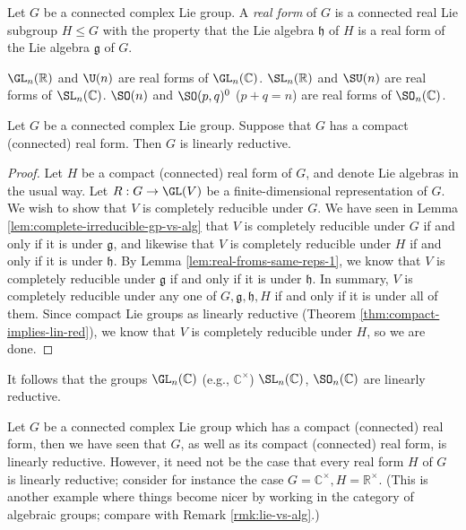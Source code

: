 \documentclass[reqno]{amsart} 
\begin{document}
\begin{definition}
  Let $G$ be a connected complex Lie group.
  A \emph{real form} of $G$ is a connected
  real Lie subgroup $H \leq G$
  with the property that
  the Lie algebra $\mathfrak{h}$ of $H$ is a real form
  of the Lie algebra $\mathfrak{g}$ of $G$.
\end{definition}


\begin{example}
  $\GL_n(\mathbb{R})$ and $\U(n)$
  are real forms of
  $\GL_n(\mathbb{C})$.
  $\SL_n(\mathbb{R})$ and $\SU(n)$
  are real forms of
  $\SL_n(\mathbb{C})$.
  $\SO(n)$ and $\SO(p,q)^0$ ($p + q = n$)
  are real forms of
  $\SO_n(\mathbb{C})$.
\end{example}
\begin{theorem}\label{thm:real-form-implies-linearly-reductive}
  Let $G$ be a connected complex Lie group.
  Suppose that $G$ has a compact (connected) real form.
  Then $G$ is linearly reductive.
\end{theorem}
\begin{proof}
  Let $H$ be a compact (connected) real form of $G$, and denote Lie algebras
  in the usual way.  Let $R : G \rightarrow \GL(V)$ be a
  finite-dimensional representation of $G$.
  We wish to show that $V$ is completely reducible under $G$.
  We have seen in
  Lemma \ref{lem:complete-irreducible-gp-vs-alg} that $V$ is
  completely reducible under $G$ if and only if it is under
  $\mathfrak{g}$, and likewise that $V$ is completely reducible
  under $H$ if and only if it is under $\mathfrak{h}$.  By Lemma
  \ref{lem:real-froms-same-reps-1}, we know that $V$ is
  completely reducible under $\mathfrak{g}$ if and only if it is
  under $\mathfrak{h}$.  In summary, $V$ is completely reducible
  under any one of $G,\mathfrak{g},\mathfrak{h},H$ if and only
  if it is under all of them.
  Since compact Lie groups as linearly reductive
  (Theorem \ref{thm:compact-implies-lin-red}),
  we know that $V$ is completely reducible under $H$,
  so we are done.
\end{proof}

\begin{example}
  It follows that the groups
  $\GL_n(\mathbb{C})$ (e.g., $\mathbb{C}^\times$)
  $\SL_n(\mathbb{C})$,
  $\SO_n(\mathbb{C})$
  are linearly reductive.
\end{example}

\begin{remark}
  Let $G$ be a connected complex Lie group
  which has a compact (connected) real form,
  then we have seen that $G$, as well as its compact (connected) real form, is linearly reductive.
  However, it need not be the case that every
  real form $H$ of $G$ is linearly reductive;
  consider for instance the case $G = \mathbb{C}^\times,
  H = \mathbb{R}^\times$.
  (This is another example where things become nicer
  by working in the category of algebraic groups;
  compare with Remark \ref{rmk:lie-vs-alg}.)
\end{remark}
\end{document}
